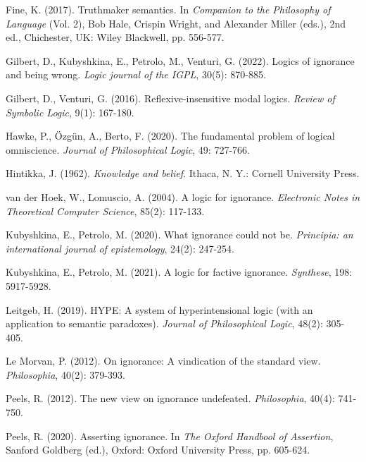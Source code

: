 \documentclass{article}
\begin{document}
 Fine, K. (2017). Truthmaker semantics. In \textit{Companion to the Philosophy of Language} (Vol. 2), Bob Hale, Crispin Wright, and Alexander Miller (eds.), 2nd ed., Chichester, UK: Wiley Blackwell, pp. 556-577.

 Gilbert, D., Kubyshkina, E., Petrolo, M., Venturi, G. (2022). Logics of ignorance and being wrong. \textit{Logic journal of the IGPL}, 30(5): 870-885.

 Gilbert, D., Venturi, G. (2016). Reflexive-insensitive modal logics. \textit{Review of Symbolic Logic}, 9(1): 167-180.

 Hawke, P., \"{O}zg\"{u}n, A., Berto, F. (2020). The fundamental problem of logical omniscience. \textit{Journal of Philosophical Logic}, 49: 727-766.

 Hintikka, J. (1962). \textit{Knowledge and belief}. Ithaca, N. Y.: Cornell University Press.

 van der Hoek, W., Lomuscio, A. (2004). A logic for ignorance. \textit{Electronic Notes in Theoretical Computer Science}, 85(2): 117-133.

 Kubyshkina, E., Petrolo, M. (2020). What ignorance could not be. \textit{Principia: an international journal of epistemology}, 24(2): 247-254. 

 Kubyshkina, E., Petrolo, M. (2021). A logic for factive ignorance. \textit{Synthese}, 198: 5917-5928.



 Leitgeb, H. (2019). HYPE: A system of hyperintensional logic (with an application to semantic paradoxes). \textit{Journal of Philosophical Logic}, 48(2): 305-405.

 Le Morvan, P. (2012). On ignorance: A vindication of the standard view. \textit{Philosophia}, 40(2): 379-393.



 Peels, R. (2012). The new view on ignorance undefeated. \textit{Philosophia}, 40(4): 741-750.

 Peels, R. (2020). Asserting ignorance. In \textit{The Oxford Handbool of Assertion}, Sanford Goldberg (ed.), Oxford: Oxford University Press, pp. 605-624.
\end{document}
